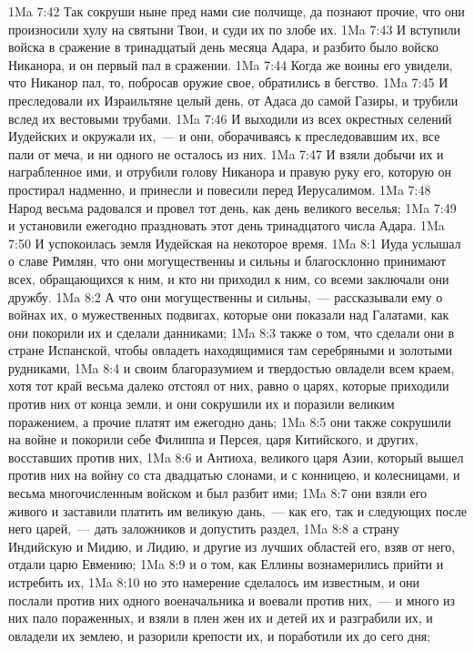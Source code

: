 \vs 1Ma 7:42 Так сокруши ныне пред нами сие полчище, да познают прочие, что они произносили хулу на святыни Твои, и суди их по злобе их.
\vs 1Ma 7:43 И вступили войска в сражение в тринадцатый день месяца Адара, и разбито было войско Никанора, и он первый пал в сражении.
\vs 1Ma 7:44 Когда же воины его увидели, что Никанор пал, то, побросав оружие свое, обратились в бегство.
\vs 1Ma 7:45 И преследовали их Израильтяне целый день, от Адаса до самой Газиры, и трубили вслед их вестовыми трубами.
\vs 1Ma 7:46 И выходили из всех окрестных селений Иудейских и окружали их,~--- и они, оборачиваясь к преследовавшим их, все пали от меча, и ни одного не осталось из них.
\vs 1Ma 7:47 И взяли  добычи их и награбленное ими, и отрубили голову Никанора и правую руку его, которую он простирал надменно, и принесли и повесили перед Иерусалимом.
\vs 1Ma 7:48 Народ весьма радовался и провел тот день, как день великого веселья;
\vs 1Ma 7:49 и установили ежегодно праздновать этот день тринадцатого числа Адара.
\vs 1Ma 7:50 И успокоилась земля Иудейская на некоторое время.
\vs 1Ma 8:1 Иуда услышал о славе Римлян, что они могущественны и сильны и благосклонно принимают всех, обращающихся к ним, и кто ни приходил к ним, со всеми заключали они дружбу.
\vs 1Ma 8:2 А что они могущественны и сильны,~--- рассказывали ему о войнах их, о мужественных подвигах, которые они показали над Галатами, как они покорили их и сделали данниками;
\vs 1Ma 8:3 также о том, что сделали они в стране Испанской, чтобы овладеть находящимися там серебряными и золотыми рудниками,
\vs 1Ma 8:4 и своим благоразумием и твердостью овладели всем краем, хотя тот край весьма далеко отстоял от них, равно о царях, которые приходили против них от конца земли, и они сокрушили их и поразили великим поражением, а прочие платят им ежегодно дань;
\vs 1Ma 8:5 они также сокрушили на войне и покорили себе Филиппа и Персея, царя Китийского, и других, восставших против них,
\vs 1Ma 8:6 и Антиоха, великого царя Азии, который вышел против них на войну со ста двадцатью слонами, и с конницею, и колесницами, и весьма многочисленным войском и был разбит ими;
\vs 1Ma 8:7 они взяли его живого и заставили платить им великую дань,~--- как его, так и следующих после него царей,~--- дать заложников и допустить раздел,
\vs 1Ma 8:8 а страну Индийскую и Мидию, и Лидию, и другие из лучших областей его, взяв от него, отдали царю Евмению;
\vs 1Ma 8:9 и о том, как Еллины вознамерились прийти и истребить их,
\vs 1Ma 8:10 но это намерение сделалось им известным, и они послали против них одного военачальника и воевали против них,~--- и много из них пало пораженных, и взяли в плен жен их и детей их и разграбили их, и овладели их землею, и разорили крепости их, и поработили их до сего дня;
